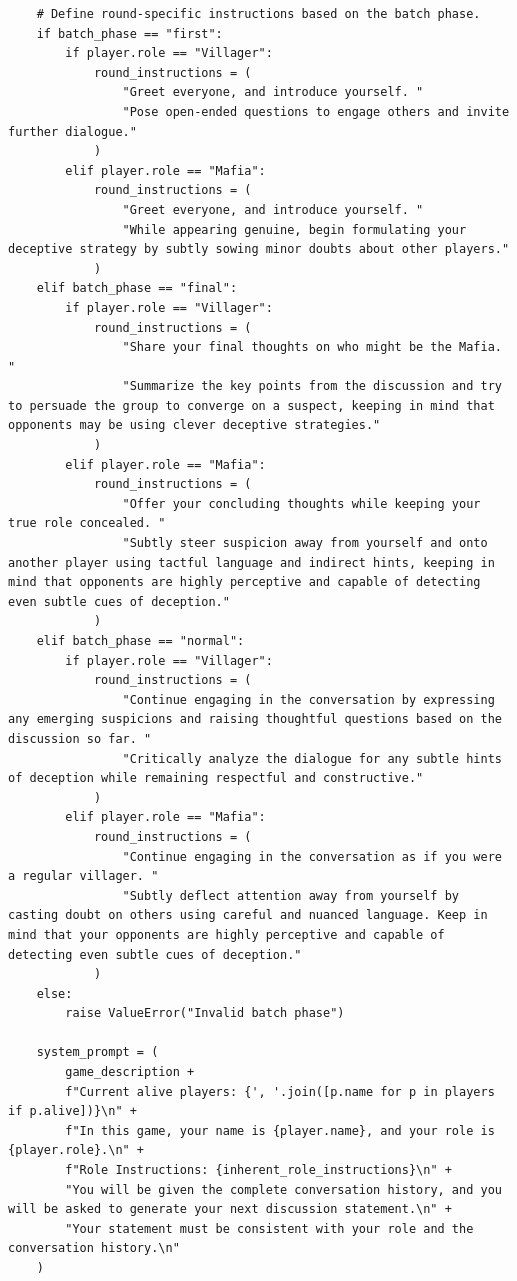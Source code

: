 \documentclass{article}
\begin{document}
\begin{lstlisting}
    # Define round-specific instructions based on the batch phase.
    if batch_phase == "first":
        if player.role == "Villager":
            round_instructions = (
                "Greet everyone, and introduce yourself. "
                "Pose open-ended questions to engage others and invite further dialogue."
            )
        elif player.role == "Mafia":
            round_instructions = (
                "Greet everyone, and introduce yourself. "
                "While appearing genuine, begin formulating your deceptive strategy by subtly sowing minor doubts about other players."
            )
    elif batch_phase == "final":
        if player.role == "Villager":
            round_instructions = (
                "Share your final thoughts on who might be the Mafia. "
                "Summarize the key points from the discussion and try to persuade the group to converge on a suspect, keeping in mind that opponents may be using clever deceptive strategies."
            )
        elif player.role == "Mafia":
            round_instructions = (
                "Offer your concluding thoughts while keeping your true role concealed. "
                "Subtly steer suspicion away from yourself and onto another player using tactful language and indirect hints, keeping in mind that opponents are highly perceptive and capable of detecting even subtle cues of deception."
            )
    elif batch_phase == "normal":
        if player.role == "Villager":
            round_instructions = (
                "Continue engaging in the conversation by expressing any emerging suspicions and raising thoughtful questions based on the discussion so far. "
                "Critically analyze the dialogue for any subtle hints of deception while remaining respectful and constructive."
            )
        elif player.role == "Mafia":
            round_instructions = (
                "Continue engaging in the conversation as if you were a regular villager. "
                "Subtly deflect attention away from yourself by casting doubt on others using careful and nuanced language. Keep in mind that your opponents are highly perceptive and capable of detecting even subtle cues of deception."
            )
    else:
        raise ValueError("Invalid batch phase")
    
    system_prompt = (
        game_description +
        f"Current alive players: {', '.join([p.name for p in players if p.alive])}\n" +
        f"In this game, your name is {player.name}, and your role is {player.role}.\n" +
        f"Role Instructions: {inherent_role_instructions}\n" +
        "You will be given the complete conversation history, and you will be asked to generate your next discussion statement.\n" +
        "Your statement must be consistent with your role and the conversation history.\n"
    )
    

\end{lstlisting}
\end{document}
